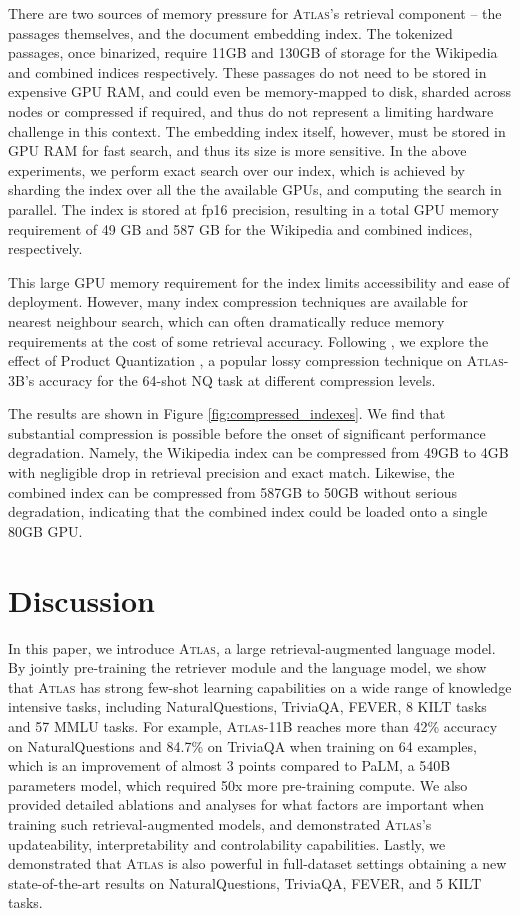 \documentclass[10pt]{article} \usepackage[preprint]{tmlr}
\newcommand{\Atlas}{\textsc{Atlas}}
\begin{document}
There are two sources of memory pressure for \Atlas{}'s retrieval component -- the passages themselves, and the document embedding index.
The tokenized passages, once binarized, require 11GB and 130GB of storage for the Wikipedia and combined indices respectively. 
These passages do not need to be stored in expensive GPU RAM, and could even be memory-mapped to disk, sharded across nodes or compressed if required, and thus do not represent a limiting hardware challenge in this context.
The embedding index itself, however, must be stored in GPU RAM for fast search, and thus its size is more sensitive.
In the above experiments, we perform exact search over our index, which is achieved by sharding the index over all the the available GPUs, and computing the search in parallel.
The index is stored at fp16 precision, resulting in a total GPU memory requirement of 49 GB and 587 GB for the Wikipedia and combined indices, respectively.

This large GPU memory requirement for the index limits accessibility and ease of deployment.
However, many index compression techniques are available for nearest neighbour search, which can often dramatically reduce memory requirements at the cost of some retrieval accuracy.
Following \citet{izacard2020memory}, we explore the effect of Product Quantization \cite[PQ,][]{jegou_quantization}, a popular lossy compression technique on \Atlas{}-3B's accuracy for the 64-shot NQ task at different compression levels.


The results are shown in Figure \ref{fig:compressed_indexes}.
We find that substantial compression is possible before the onset of significant performance degradation. 
Namely, the Wikipedia index can be compressed from 49GB to 4GB with negligible drop in retrieval precision and exact match.
Likewise, the combined index can be compressed from 587GB to 50GB without serious degradation, indicating that the combined index could be loaded onto a single 80GB GPU.

\section{Discussion}
In this paper, we introduce \Atlas, a large retrieval-augmented language model.
By jointly pre-training the retriever module and the language model, we show that \Atlas{} has strong few-shot learning capabilities on a wide range of knowledge intensive tasks, including NaturalQuestions, TriviaQA, FEVER, 8 KILT tasks and 57 MMLU tasks.
For example, \Atlas{}-11B  reaches more than 42\% accuracy on NaturalQuestions and 84.7\% on TriviaQA when training on 64 examples, which is an improvement of almost 3 points compared to PaLM, a 540B parameters model, which required 50x more pre-training compute.
We also provided detailed ablations and analyses for what factors are important when training such retrieval-augmented models, and demonstrated \Atlas{}'s updateability, interpretability and controlability capabilities.
Lastly, we demonstrated that \Atlas{} is also powerful in full-dataset settings obtaining a new state-of-the-art results on NaturalQuestions, TriviaQA, FEVER, and 5 KILT tasks.
\end{document}
